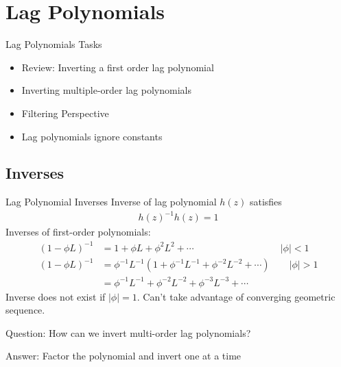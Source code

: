 \documentclass[handout]{beamer}
\begin{document}
\section{Lag Polynomials}


\begin{frame}[shrink]{Lag Polynomials}
Tasks
\begin{itemize}
  \item Review: Inverting a first order lag polynomial
  \item Inverting multiple-order lag polynomials
  \item Filtering Perspective
  \item Lag polynomials ignore constants
\end{itemize}
\end{frame}


\subsection{Inverses}



\begin{frame}[shrink]{Lag Polynomial Inverses}
Inverse of lag polynomial $h(z)$ satisfies
\begin{align*}
  h(z)^{-1}h(z) = 1
\end{align*}
Inverses of first-order polynomials:
\begin{align*}
  (1-\phi L)^{-1}
  &=
  1 + \phi L + \phi^2 L^2 + \cdots
  \qquad
  \qquad
  \qquad
  \qquad
  \quad
  |\phi|<1
  \\
  (1-\phi L)^{-1}
  &=
  \phi^{-1}L^{-1}
  (1+ \phi^{-1}L^{-1} + \phi^{-2}L^{-2} + \cdots)
  \qquad
  |\phi|>1
  \\
  &=
  \phi^{-1}L^{-1} + \phi^{-2}L^{-2} + \phi^{-3}L^{-3} + \cdots
\end{align*}
Inverse does not exist if $|\phi|=1$.
Can't take advantage of converging geometric sequence.

\pause
\alert{Question}:
How can we invert multi-order lag polynomials?

\pause
\alert{Answer}: Factor the polynomial and invert one at a time
\end{frame}
\end{document}

